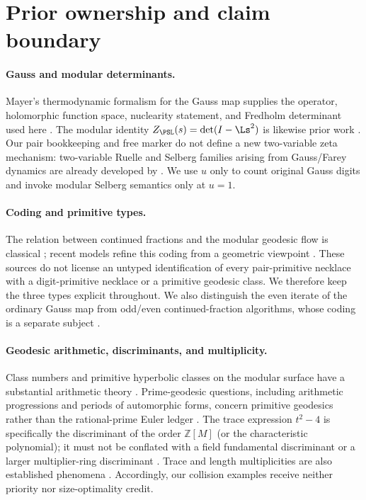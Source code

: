 \section{Prior ownership and claim boundary}
\label{sec:related}

\paragraph{Gauss and modular determinants.}
Mayer's thermodynamic formalism for the Gauss map supplies the operator,
holomorphic function space, nuclearity statement, and Fredholm determinant
used here \citep{Mayer1990Gauss}.  The modular identity
$Z_{\PSL}(s)=\det(I-\Ls^2)$ is likewise prior work
\citep{Mayer1991Selberg,Mayer1990SelbergPreprint}.  Our pair bookkeeping and
free marker do not define a new two-variable zeta mechanism: two-variable
Ruelle and Selberg families arising from Gauss/Farey dynamics are already
developed by \citet{BonannoIsola2014TwoVariable}.  We use $u$ only to count
original Gauss digits and invoke modular Selberg semantics only at $u=1$.

\paragraph{Coding and primitive types.}
The relation between continued fractions and the modular geodesic flow is
classical \citep{Series1985Modular}; recent models refine this coding from a
geometric viewpoint \citep{ArnouxSchmidt2026Elegant}.  These sources do not
license an untyped identification of every pair-primitive necklace with a
digit-primitive necklace or a primitive geodesic class.  We therefore keep
the three types explicit throughout.  We also distinguish the even iterate
of the ordinary Gauss map from odd/even continued-fraction algorithms, whose
coding is a separate subject \citep{BocaMerriman2017Coding}.

\paragraph{Geodesic arithmetic, discriminants, and multiplicity.}
Class numbers and primitive hyperbolic classes on the modular surface have a
substantial arithmetic theory \citep{Sarnak1982ClassNumbers}.  Prime-geodesic
questions, including arithmetic progressions and periods of automorphic
forms, concern primitive geodesics rather than the rational-prime Euler
ledger \citep{ChatzakosHarcosKaneko2024,
ConstantinescuNordentoft2025}.  The trace expression $t^2-4$ is specifically
the discriminant of the order $\mathbb Z[M]$ (or the characteristic
polynomial); it must not be conflated with a field fundamental discriminant
or a larger multiplier-ring discriminant \citep{Maucourant2025Discriminants}.
Trace and length multiplicities are also established phenomena
\citep{Peter2002Multiplicity,BelolipetskyEtAl2026Multiplicity}.  Accordingly,
our collision examples receive neither priority nor size-optimality credit.

